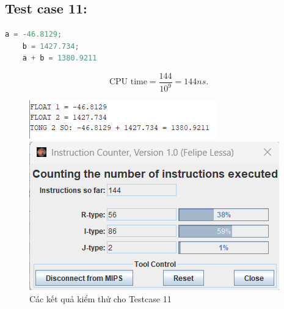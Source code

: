 \subsection{Test case 11:}
\begin{lstlisting}[language=Python]
    a = -46.8129;
    b = 1427.734;
    a + b = 1380.9211 
\end{lstlisting}
\[
\text{CPU time} = \frac{\text{144}}{10^9} = 144 ns.
\]
\begin{figure}[!h]
    \centering
    \begin{minipage}[b]{0.48\textwidth}
        \centering
        \includegraphics[width=\textwidth]{image/TESTCASE/Testcase 11.png}
    \end{minipage}
    \hfill
    \begin{minipage}[b]{0.48\textwidth}
        \centering
        \includegraphics[width=\textwidth]{image/TESTCASE/Instruction Counter 11.png}
    \end{minipage}
    \vspace{0.5cm}
    \caption{Các kết quả kiểm thử cho Testcase 11}
\end{figure}

\vspace{0.5cm}

